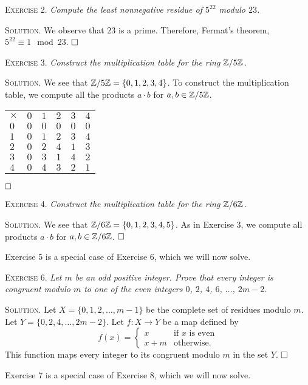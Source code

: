 \documentclass[11pt, leqno]{article}
\newcommand{\done}{\ensuremath{\hfill\square}}
\begin{document}
\textsc{Exercise 2}. \emph{Compute the least nonnegative residue of $5^{22}$ modulo $23$.}

\textsc{Solution}. We observe that $23$ is a prime. Therefore, Fermat's theorem, $5^{22} \equiv 1 \mod 23$. \done

\textsc{Exercise 3}. \emph{Construct the multiplication table for the ring $\mathbb{Z}/5\mathbb{Z}$.}

\textsc{Solution}. We see that $\mathbb{Z}/5\mathbb{Z} = \{ 0, 1, 2, 3, 4\}$. To construct the multiplication table, we compute all the products $a\cdot b$ for $a, b \in \mathbb{Z}/5\mathbb{Z}$.
\begin{longtable}{p{2em} p{2em} p{2em} p{2em} p{2em} p{2em}}
  $\times$ & $0$ & $1$ & $2$ & $3$ & $4$ \\
  $0$      & $0$ & $0$ & $0$ & $0$ & $0$ \\
  $1$      & $0$ & $1$ & $2$ & $3$ & $4$ \\
  $2$      & $0$ & $2$ & $4$ & $1$ & $3$ \\
  $3$      & $0$ & $3$ & $1$ & $4$ & $2$ \\
  $4$      & $0$ & $4$ & $3$ & $2$ & $1$
\end{longtable}
\reduce
\done

\textsc{Exercise 4}. \emph{Construct the multiplication table for the ring $\mathbb{Z}/6\mathbb{Z}$.}

\textsc{Solution}. We see that $\mathbb{Z}/6\mathbb{Z} = \{ 0, 1, 2, 3, 4, 5 \}$. As in Exercise $3$, we compute all products $a \cdot b$ for $a, b \in \mathbb{Z}/6\mathbb{Z}$. \done

Exercise 5 is a special case of Exercise 6, which we will now solve.

\textsc{Exercise 6}. \emph{Let $m$ be an odd positive integer. Prove that every integer is congruent modulo $m$ to one of the even integers $0$, $2$, $4$, $6$, $\ldots$, $2m-2$.}

\textsc{Solution}. Let $X=\{0,1,2,\ldots,m-1\}$ be the complete set of residues modulo $m$. Let $Y=\{0,2,4,\ldots,2m-2\}$. Let $f: X \to Y$ be a map defined by 
\begin{displaymath}
  f(x) = \begin{cases}
    x & \text{if } x \text{ is even} \\
    x+m & \text{otherwise.}
  \end{cases}
\end{displaymath}
This function maps every integer to its congruent modulo $m$ in the set $Y$. \done

Exercise 7 is a special case of Exercise 8, which we will now solve.
\end{document}
